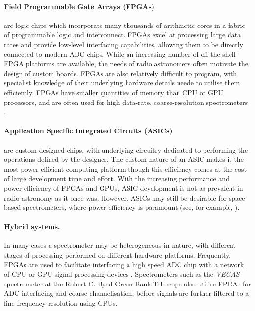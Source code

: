 \documentclass{ws-rv961x669}
\begin{document}
\paragraph{Field Programmable Gate Arrays (FPGAs)} are logic chips which incorporate many thousands of arithmetic cores in a fabric of programmable logic and interconnect. FPGAs excel at processing large data rates and provide low-level interfacing capabilities, allowing them to be directly connected to modern ADC chips. While an increasing number of off-the-shelf FPGA platforms are available, the needs of radio astronomers often motivate the design of custom boards. FPGAs are also relatively difficult to program, with specialist knowledge of their underlying hardware details neede to utilise them efficiently. FPGAs have smaller quantities of memory than CPU or GPU processors, and are often used for high data-rate, coarse-resolution spectrometers \citep{Stanko2005, Finger2012}.

\paragraph{Application Specific Integrated Circuits (ASICs)} are custom-designed chips, with underlying circuitry dedicated to performing the operations defined by the designer. The custom nature of an ASIC makes it the most power-efficient computing platform though this efficiency comes at the cost of large development time and effort.
With the increasing performance and power-efficiency of FPGAs and GPUs, ASIC development is not as prevalent in radio astronomy as it once was.
However, ASICs may still be desirable for space-based spectrometers, where power-efficiency is paramount (see, for example, \cite{hochman2014splash}).

\paragraph{Hybrid systems.} In many cases a spectrometer may be heterogeneous in nature, with different stages of processing performed on different hardware platforms.
Frequently, FPGAs are used to facilitate interfacing a high speed ADC chip with a network of CPU or GPU signal processing devices \citep{Siemion2011}. 
Spectrometers such as the \emph{VEGAS} spectrometer at the Robert C. Byrd Green Bank Telescope \citep{Prestage2015} also utilise FPGAs for ADC interfacing and coarse channelisation, before signals are further filtered to a fine frequency resolution using GPUs.
\end{document}
